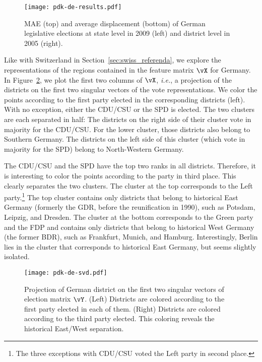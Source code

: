 \begin{figure}
	\texttt{[image: pdk-de-results.pdf]}
	\caption{MAE (top) and average displacement (bottom) of German legislative elections at state level in 2009 (left) and district level in 2005 (right).}
	\label{fig:de_results}
\end{figure}

Like with Switzerland in Section~\ref{sec:swiss_referenda}, we explore the representations of the regions contained in the feature matrix $\vX$ for Germany.
In Figure~\ref{fig:de_svd}, we plot the first two columns of $\vX$, \textit{i.e.}, a projection of the districts on the first two singular vectors of the vote representations.
We color the points according to the first party elected in the corresponding districts (left).
With no exception, either the CDU/CSU or the SPD is elected.
The two clusters are each separated in half:
The districts on the right side of their cluster vote in majority for the CDU/CSU.
For the lower cluster, those districts also belong to Southern Germany.
The districts on the left side of this cluster (which vote in majority for the SPD) belong to North-Western Germany.

The CDU/CSU and the SPD have the top two ranks in all districts.
Therefore, it is interesting to color the points according to the party in third place.
This clearly separates the two clusters.
The cluster at the top corresponds to the Left party.\footnote{The three exceptions with CDU/CSU voted the Left party in second place.}
The top cluster contains only districts that belong to historical East Germany (formerly the GDR, before the reunification in 1990), such as Potsdam, Leipzig, and Dresden.
The cluster at the bottom corresponds to the Green party and the FDP and contains only districts that belong to historical West Germany (the former BDR), such as Frankfurt, Munich, and Hamburg.
Interestingly, Berlin lies in the cluster that corresponds to historical East Germany, but seems slightly isolated.

\begin{figure}
	\texttt{[image: pdk-de-svd.pdf]}
	\caption{
		Projection of German district on the first two singular vectors of election matrix $\vY$.
		(Left) Districts are colored according to the first party elected in each of them.
		(Right) Districts are colored according to the third party elected.
		This coloring reveals the historical East/West separation.
	}
	\label{fig:de_svd}
\end{figure}

